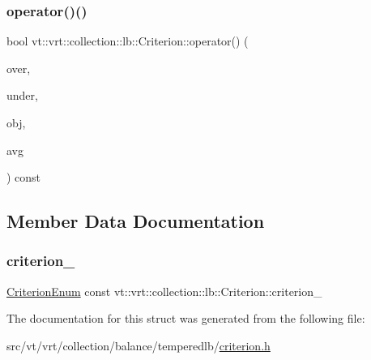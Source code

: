 \subsubsection{\texorpdfstring{operator()()}{operator()()}}
{\footnotesize\ttfamily bool vt\+::vrt\+::collection\+::lb\+::\+Criterion\+::operator() (\begin{DoxyParamCaption}\item[{\hyperlink{structvt_1_1vrt_1_1collection_1_1lb_1_1_criterion_base_a78e6b14fc6f7b34acac1d7cd4e850180}{Load\+Type}}]{over,  }\item[{\hyperlink{structvt_1_1vrt_1_1collection_1_1lb_1_1_criterion_base_a78e6b14fc6f7b34acac1d7cd4e850180}{Load\+Type}}]{under,  }\item[{\hyperlink{structvt_1_1vrt_1_1collection_1_1lb_1_1_criterion_base_a78e6b14fc6f7b34acac1d7cd4e850180}{Load\+Type}}]{obj,  }\item[{\hyperlink{structvt_1_1vrt_1_1collection_1_1lb_1_1_criterion_base_a78e6b14fc6f7b34acac1d7cd4e850180}{Load\+Type}}]{avg }\end{DoxyParamCaption}) const\hspace{0.3cm}{\ttfamily [inline]}}



\subsection{Member Data Documentation}
\mbox{\label{structvt_1_1vrt_1_1collection_1_1lb_1_1_criterion_abec00c435938c265ec0b3e3d984c09a6}} 
\subsubsection{\texorpdfstring{criterion\+\_\+}{criterion\_}}
{\footnotesize\ttfamily \hyperlink{namespacevt_1_1vrt_1_1collection_1_1lb_a4e454750e102cf5404d5ac151148951c}{Criterion\+Enum} const vt\+::vrt\+::collection\+::lb\+::\+Criterion\+::criterion\+\_\+\hspace{0.3cm}{\ttfamily [protected]}}



The documentation for this struct was generated from the following file\+:\begin{DoxyCompactItemize}
\item 
src/vt/vrt/collection/balance/temperedlb/\hyperlink{criterion_8h}{criterion.\+h}\end{DoxyCompactItemize}
